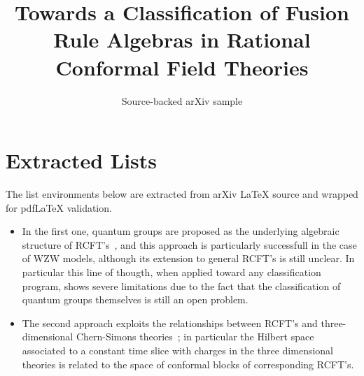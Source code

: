 \documentclass[11pt]{article}
\title{Towards a Classification of Fusion Rule Algebras in Rational Conformal
  Field Theories}
\author{Source-backed arXiv sample}
\date{}
\begin{document}
\maketitle
\section{Extracted Lists}

The list environments below are extracted from arXiv LaTeX source and wrapped for pdfLaTeX validation.

\begin{itemize}
\item In the first one, quantum groups are proposed as the underlying
      algebraic structure of RCFT's~\cite{qgroups}, and this approach is
      particularly successfull in the case of WZW models, although
      its extension to general RCFT's is still unclear. In particular this
      line of thougth, when applied toward any classification program,
      shows severe limitations due to the fact
      that the classification of quantum groups themselves is still an
      open problem.
\item The second approach exploits the relationships between
      RCFT's and three-dimensional Chern-Simons theories~\cite{c-s};
      in particular the
      Hilbert space associated to a constant time slice with charges in the
      three dimensional theories is related to the space of conformal blocks
      of corresponding RCFT's.
\end{itemize}
\end{document}
